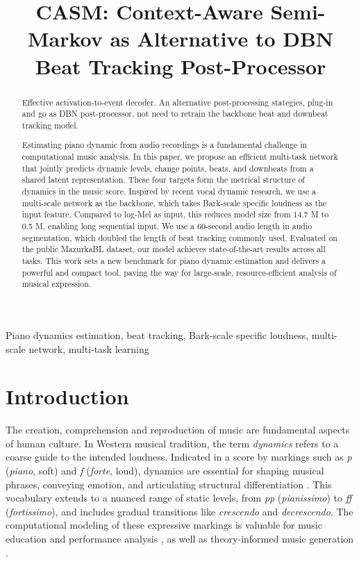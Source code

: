 \documentclass{article}
\title{CASM: Context-Aware Semi-Markov as Alternative to DBN Beat Tracking Post-Processor}
\begin{document}
\ninept
%
\maketitle
%
\begin{abstract}
Effective activation-to-event decoder. An alternative post-processing stategies, plug-in and go as DBN post-processor, not need to retrain the backbone beat and downbeat tracking model.

Estimating piano dynamic from audio recordings is a fundamental challenge in computational music analysis. In this paper, we propose an efficient multi-task network that jointly predicts dynamic levels, change points, beats, and downbeats from a shared latent representation. These four targets form the metrical structure of dynamics in the music score. Inspired by recent vocal dynamic research, we use a multi-scale network as the backbone, which takes Bark-scale specific loudness as the input feature. Compared to log-Mel as input, this reduces model size from 14.7 M to 0.5 M, enabling long sequential input. We use a 60-second audio length in audio segmentation, which doubled the length of beat tracking commonly used. Evaluated on the public MazurkaBL dataset, our model achieves state-of-the-art results across all tasks. This work sets a new benchmark for piano dynamic estimation and delivers a powerful and compact tool, paving the way for large-scale, resource-efficient analysis of musical expression.

\end{abstract}
%
\begin{keywords}
Piano dynamics estimation, beat tracking, Bark-scale specific loudness, multi-scale network, multi-task learning
\end{keywords}
%
\section{Introduction}
\label{sec:intro}
The creation, comprehension and reproduction of music are fundamental aspects of human culture. In Western musical tradition, the term \textit{dynamics} refers to a coarse guide to the intended loudness. Indicated in a score by markings such as \textit{p} (\textit{piano}, soft) and \textit{f} (\textit{forte}, loud), dynamics are essential for shaping musical phrases, conveying emotion, and articulating structural differentiation \cite{cancinoChacon2018computational}. This vocabulary extends to a nuanced range of static levels, from \textit{pp} (\textit{pianissimo}) to \textit{ff} (\textit{fortissimo}), and includes gradual transitions like \textit{crescendo} and \textit{decrescendo}. The computational modeling of these expressive markings is valuable for music education and performance analysis \cite{narang2022analysis, zhang2025llaqo, park2025dynvisual}, as well as theory-informed music generation \cite{wu2024musiccontrolnet, he2025filling}.
\end{document}
